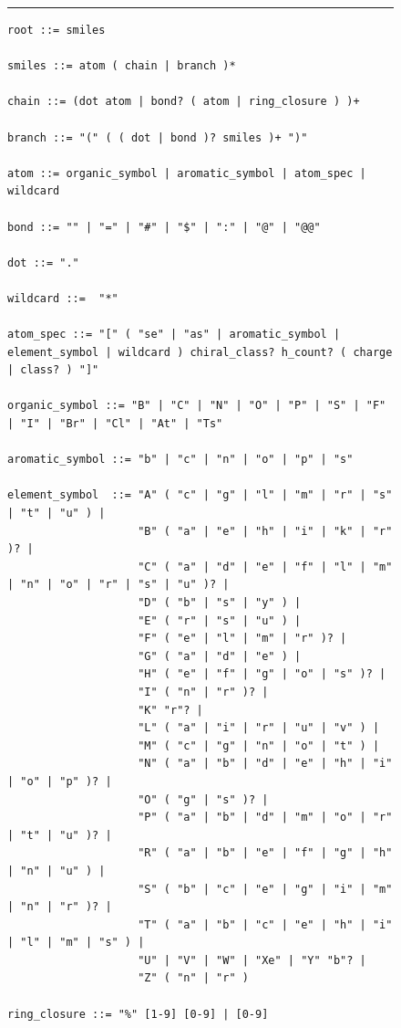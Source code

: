 \documentclass{article}
\theoremstyle{plain}
\theoremstyle{definition}
\theoremstyle{remark}
\begin{document}
\begin{figure}[!htbp]
\centering
\begin{minipage}{0.97\linewidth}
\hrule \vspace{3pt}
\scriptsize
\begin{verbatim}
root ::= smiles

smiles ::= atom ( chain | branch )*

chain ::= (dot atom | bond? ( atom | ring_closure ) )+

branch ::= "(" ( ( dot | bond )? smiles )+ ")"

atom ::= organic_symbol | aromatic_symbol | atom_spec | wildcard

bond ::= "" | "=" | "#" | "$" | ":" | "@" | "@@"

dot ::= "."

wildcard ::=  "*"

atom_spec ::= "[" ( "se" | "as" | aromatic_symbol | element_symbol | wildcard ) chiral_class? h_count? ( charge | class? ) "]"

organic_symbol ::= "B" | "C" | "N" | "O" | "P" | "S" | "F" | "I" | "Br" | "Cl" | "At" | "Ts"

aromatic_symbol ::= "b" | "c" | "n" | "o" | "p" | "s"

element_symbol  ::= "A" ( "c" | "g" | "l" | "m" | "r" | "s" | "t" | "u" ) |
                    "B" ( "a" | "e" | "h" | "i" | "k" | "r" )? |
                    "C" ( "a" | "d" | "e" | "f" | "l" | "m" | "n" | "o" | "r" | "s" | "u" )? |
                    "D" ( "b" | "s" | "y" ) |
                    "E" ( "r" | "s" | "u" ) |
                    "F" ( "e" | "l" | "m" | "r" )? |
                    "G" ( "a" | "d" | "e" ) |
                    "H" ( "e" | "f" | "g" | "o" | "s" )? |
                    "I" ( "n" | "r" )? |
                    "K" "r"? |
                    "L" ( "a" | "i" | "r" | "u" | "v" ) |
                    "M" ( "c" | "g" | "n" | "o" | "t" ) |
                    "N" ( "a" | "b" | "d" | "e" | "h" | "i" | "o" | "p" )? |
                    "O" ( "g" | "s" )? |
                    "P" ( "a" | "b" | "d" | "m" | "o" | "r" | "t" | "u" )? |
                    "R" ( "a" | "b" | "e" | "f" | "g" | "h" | "n" | "u" ) |
                    "S" ( "b" | "c" | "e" | "g" | "i" | "m" | "n" | "r" )? |
                    "T" ( "a" | "b" | "c" | "e" | "h" | "i" | "l" | "m" | "s" ) |
                    "U" | "V" | "W" | "Xe" | "Y" "b"? |
                    "Z" ( "n" | "r" )

ring_closure ::= "%" [1-9] [0-9] | [0-9]


\end{verbatim}
\end{minipage}
\end{figure}
\end{document}
